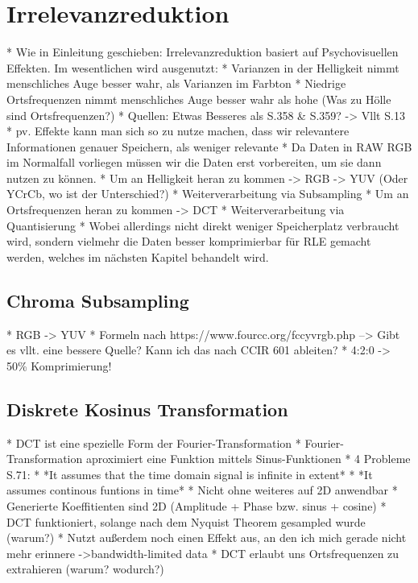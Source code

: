 \chapter{Irrelevanzreduktion}
\label{kap:Irrelevanzreduktion}

* Wie in Einleitung geschieben: Irrelevanzreduktion basiert auf Psychovisuellen Effekten. Im wesentlichen wird ausgenutzt:
	* Varianzen in der Helligkeit nimmt menschliches Auge besser wahr, als Varianzen im Farbton
	* Niedrige Ortsfrequenzen nimmt menschliches Auge besser wahr als hohe (Was zu Hölle sind Ortsfrequenzen?)
	* Quellen: Etwas Besseres als \cite{dankmeier_grundkurs_2006} S.358 \& S.359? -> Vllt \cite{akramullah_digital_2014} S.13
* pv. Effekte kann man sich so zu nutze machen, dass wir relevantere Informationen genauer Speichern, als weniger relevante
* Da Daten in RAW RGB im Normalfall vorliegen müssen wir die Daten erst vorbereiten, um sie dann nutzen zu können.
	* Um an Helligkeit heran zu kommen -> RGB -> YUV (Oder YCrCb, wo ist der Unterschied?)
		* Weiterverarbeitung via Subsampling
	* Um an Ortsfrequenzen heran zu kommen -> DCT
		* Weiterverarbeitung via Quantisierung
		* Wobei allerdings nicht direkt weniger Speicherplatz verbraucht wird, sondern vielmehr die Daten besser komprimierbar für RLE gemacht werden, welches im nächsten Kapitel behandelt wird.

\section{Chroma Subsampling}

* RGB -> YUV
* Formeln nach https://www.fourcc.org/fccyvrgb.php --> Gibt es vllt. eine bessere Quelle? Kann ich das nach CCIR 601 ableiten?
* 4:2:0 -> 50\% Komprimierung!

\section{Diskrete Kosinus Transformation}

* DCT ist eine spezielle Form der Fourier-Transformation
	* Fourier-Transformation aproximiert eine Funktion mittels Sinus-Funktionen
	* 4 Probleme \cite{symes_peter_digital_2004} S.71:
		* *It assumes that the time domain signal is infinite in extent*
		* *It assumes continous funtions in time*
		* Nicht ohne weiteres auf 2D anwendbar
		* Generierte Koeffitienten sind 2D (Amplitude + Phase bzw. sinus + cosine)
	* DCT funktioniert, solange nach dem Nyquist Theorem gesampled wurde (warum?)
	* Nutzt außerdem noch einen Effekt aus, an den ich mich gerade nicht mehr erinnere ->bandwidth-limited data
* DCT erlaubt uns Ortsfrequenzen zu extrahieren (warum? wodurch?)

